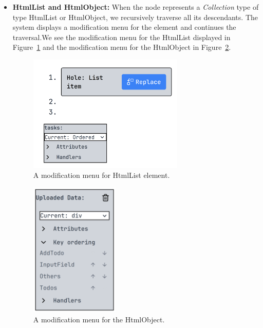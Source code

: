 \begin{itemize}
	\item \textbf{HtmlList and HtmlObject:} When the node represents a \emph{Collection} type of type HtmlList or HtmlObject, we recursively traverse all its descendants.
	      The system displays a modification menu for the element and continues the traversal.We see the modification menu for the HtmlList displayed in Figure~\ref{fig:htmlListtMenu} and the modification menu for the HtmlObject in Figure~\ref{fig:htmlObjectMenu}.

	      \begin{figure}[htbp]
		      \begin{center}
			      \includegraphics[width=0.7\textwidth]{img/htmlListMenu.pdf}
		      \end{center}
		      \caption{A modification menu for HtmlList element.}\label{fig:htmlListtMenu}
	      \end{figure}

	      \begin{figure}[htbp]
		      \begin{center}
			      \includegraphics[width=0.4\textwidth]{img/htmlObjectMenu.pdf}
		      \end{center}
		      \caption{A modification menu for the HtmlObject.}\label{fig:htmlObjectMenu}
	      \end{figure}

\end{itemize}

